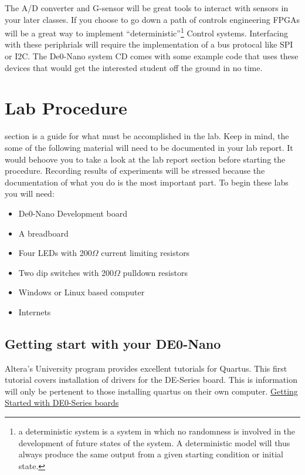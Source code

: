       The A/D converter and G-sensor will be great tools to interact with sensors in your later classes. If you choose to go down a path of controls engineering FPGAs will be a great way to implement ``deterministic''\footnote{a deterministic system is a system in which no randomness is involved in the development of future states of the system. A deterministic model will thus always produce the same output from a given starting condition or initial state.\cite{DynamicSystems}} Control systems. Interfacing with these periphrials will require the implementation of a bus protocal like SPI or I2C. The De0-Nano system CD comes with some example code that uses these devices that would get the interested student off the ground in no time.

  \section{Lab Procedure}
     section is a guide for what must be accomplished in the lab. Keep in mind, the some of the following material will need to be documented in your lab report. It would behoove you to take a look at the lab report section before starting the procedure. Recording results of experiments will be stressed because the documentation of what you do is the most important part. To begin these labs you will need:
    \begin{itemize}
      \item De0-Nano Development board
      \item A breadboard
      \item Four LEDs with 200$\Omega$ current limiting resistors
      \item Two dip switches with 200$\Omega$ pulldown resistors
      \item Windows or Linux based computer
      \item Internets
    \end{itemize}
    
    \subsection{Getting start with your DE0-Nano}
      Altera's University program provides excellent tutorials for Quartus. This first tutorial covers installation of drivers for the DE-Series board. This is information will only be pertenent to those installing quartus on their own computer. \href{ftp://ftp.altera.com/up/pub/Altera_Material/13.0/Tutorials/Schematic/Quartus_II_Introduction.pdf}{Getting Started with DE0-Series boards} 

